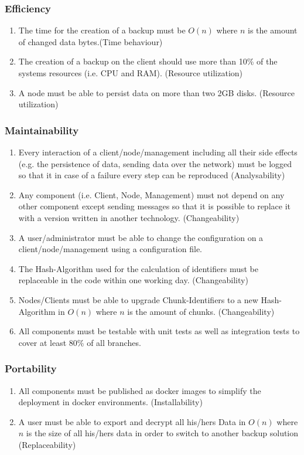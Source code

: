 \subsubsection{Efficiency}
\begin{enumerate}
	\enumcountrestore
	\item The time for the creation of a backup must be $O(n)$ where $n$ is the amount of changed data bytes.(Time behaviour)
	\item The creation of a backup on the client should use more than 10\% of the systems resources (i.e. CPU and RAM). (Resource utilization)
	\item A node must be able to persist data on more than two 2GB disks. (Resource utilization)
	\enumcountsave
\end{enumerate}

\subsubsection{Maintainability}
\begin{enumerate}
	\enumcountrestore
	\item Every interaction of a client/node/management including all their side effects (e.g. the persistence of data, sending data over the network) must be logged so that it in case of a failure every step can be reproduced (Analysability)
	\item Any component (i.e. Client, Node, Management) must not depend on any other component except sending messages so that it is possible to replace it with a version written in another technology. (Changeability)
	\item A user/administrator must be able to change the configuration on a client/node/management using a configuration file.
	\item The Hash-Algorithm used for the calculation of identifiers must be replaceable in the code within one working day. (Changeability)
	\item Nodes/Clients must be able to upgrade Chunk-Identifiers to a new Hash-Algorithm in $O(n)$ where $n$ is the amount of chunks. (Changeability)
	\item All components must be testable with unit tests as well as integration tests to cover at least 80\% of all branches.
	\enumcountsave
\end{enumerate}

\subsubsection{Portability}

\begin{enumerate}
	\enumcountrestore
	\item All components must be published as docker images to simplify the deployment in docker environments. (Installability)
	\item A user must be able to export and decrypt all his/hers Data in $O(n)$ where $n$ is the size of all his/hers data in order to switch to another backup solution (Replaceability)
	\enumcountsave
\end{enumerate}
